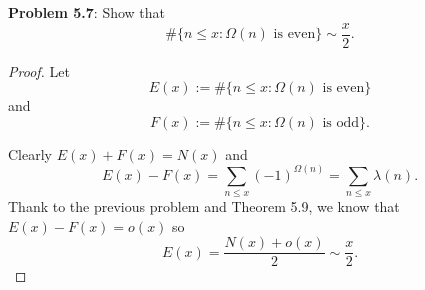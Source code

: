 \documentclass[12pt]{article}
\begin{document}
\fi

\textbf{Problem 5.7}: Show that
$$\#\{n \leq x : \Omega(n) \text{ is even}\} \sim \frac{x}{2}.$$

\begin{proof}
Let
$$E(x) := \#\{n \leq x : \Omega(n) \text{ is even}\}$$
and
$$F(x) := \#\{n \leq x : \Omega(n) \text{ is odd}\}.$$

Clearly $E(x) + F(x) = N(x)$ and
$$E(x) - F(x) = \sum_{n \leq x} (-1)^{\Omega(n)} = \sum_{n \leq x} \lambda(n).$$
Thank to the previous problem and Theorem 5.9, we know that $E(x) - F(x) = o(x)$ so
$$E(x) = \frac{N(x) + o(x)}{2} \sim \frac{x}{2}.$$
\end{proof}

\unless\ifdefined\IsMainDocument
\end{document}
